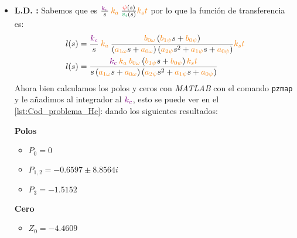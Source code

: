 \begin{itemize}
    \item \textbf{L.D. :} Sabemos que es \( \frac{\mora{k_c}}{s}\nara{k_a} \frac{\rojo{\psi}(s)}{\verd{v_i}(s)}\nara{k_st} \) por lo que la función de transferencia es:
    \begin{align*}
        l(s)&= \frac{\mora{k_c}}{s}\nara{k_a}\frac{\nara{\nara{b_{0\omega}}}\left(\nara{b_{1\psi}}s + \nara{b_{0\psi}}\right)}
        {\left(\nara{a_{1\omega}}s + \nara{a_{0\omega}}\right)\left(\nara{a_{2\psi}}s^{2} + \nara{a_{1\psi}}s + \nara{a_{0\psi}}\right)} \nara{k_st}\\
        l(s)&= \frac{  \mora{k_c} \nara{k_a} \nara{\nara{b_{0\omega}}}\left(\nara{b_{1\psi}}s + \nara{b_{0\psi}}\right) \nara{k_st}  }
        { s \left(\nara{a_{1\omega}}s + \nara{a_{0\omega}}\right)\left(\nara{a_{2\psi}}s^{2} + \nara{a_{1\psi}}s + \nara{a_{0\psi}} \right)   } 
    \end{align*}
    Ahora bien calculamos los polos y ceros con \textit{MATLAB} con el comando \verb|pzmap| y le añadimos al integrador al \(\mathbin{\color{violet}k_c}\), esto se puede ver en el \autoref{lst:Cod_problema_Hc}: dando los siguientes resultados:

\begin{multicols}{2}
    \textbf{Polos}
    \begin{itemize}
        \item \(P_0 = 0 \)
        \item \(P_{1,2} = -0.6597 \pm 8.8564i\) 
        \item \(P_3 = -1.5152 \)
    \end{itemize}
    \columnbreak
    \textbf{Cero}
    \begin{itemize}
        \item \(Z_0 = -4.4609\)
    \end{itemize}
  \end{multicols}




\end{itemize}
